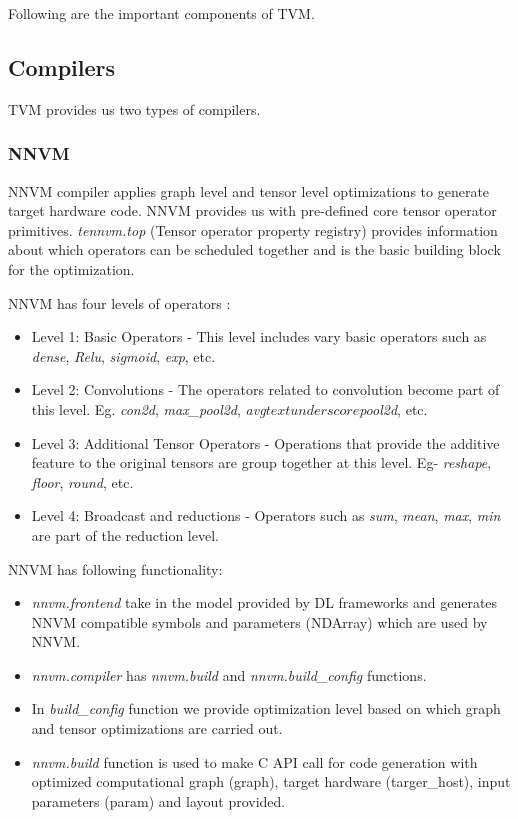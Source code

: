  Following are the important components of TVM.
 
 \subsection{Compilers}
 TVM provides us two types of compilers.
 
 
 \subsubsection{NNVM}
 
 NNVM compiler applies graph level and tensor level optimizations to generate target hardware code. NNVM provides us with pre-defined core tensor operator primitives. \textit{tennvm.top} (Tensor operator property registry) provides information about which operators can be scheduled together and is the basic building block for the optimization.
 
 NNVM has four levels of operators :
 
 \begin{itemize}
    \item Level 1: Basic Operators - This level includes vary basic operators such as \textit{dense}, \textit{Relu}, \textit{sigmoid}, \textit{exp}, etc.
    \item Level 2: Convolutions - The operators related to convolution become part of this level. Eg. \textit{con2d}, \textit{max\_pool2d}, \textit{avg$textunderscore$pool2d}, etc.
    \item Level 3: Additional Tensor Operators - Operations that provide the additive feature to the original tensors are group together at this level. Eg- \textit{reshape}, \textit{floor}, \textit{round}, etc.
    \item Level 4: Broadcast and reductions - Operators such as \textit{sum}, \textit{mean}, \textit{max},  \textit{min} are part of the reduction level.
 \end{itemize}
 
 NNVM has following functionality:
 
 \begin{itemize}
    \item \textit{nnvm.frontend} take in the model provided by DL frameworks and generates NNVM compatible symbols and parameters (NDArray) which are used by NNVM.
    \item  \textit{nnvm.compiler} has  \textit{nnvm.build} and  \textit{nnvm.build\_config} functions.
    \item In \textit{build\_config} function we provide optimization level based on which graph and tensor optimizations are carried out.
    \item \textit{nnvm.build} function is used to make C API call for code generation with optimized computational graph (graph), target hardware (targer\_host), input parameters (param) and layout provided. 

 \end{itemize}
 
